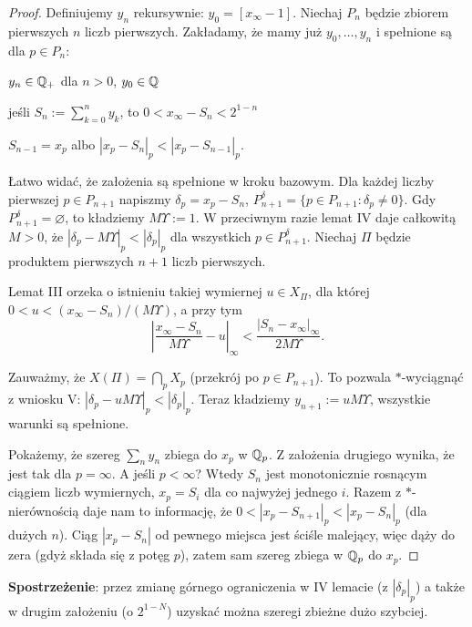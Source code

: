 \begin{proof}
	Definiujemy $y_n$ rekursywnie: $y_0 = [x_\infty -1]$.
	Niechaj $P_n$ będzie zbiorem pierwszych $n$ liczb pierwszych.
	Zakładamy, że mamy już $y_0, \dots, y_n$ i spełnione są dla $p \in P_n$:
	\begin{enumx}
	\item $y_n \in \mathbb Q_+$ dla $n > 0$, $y_0 \in \mathbb Q$
	\item jeśli $S_n := \sum_{k=0}^n y_k$, to $0 < x_\infty - S_n < 2^{1-n}$
	\item $S_{n-1} = x_p$ albo $|x_p - S_n|_p < |x_p - S_{n-1}|_p$.
	\end{enumx}
	
	Łatwo widać, że założenia są spełnione w kroku bazowym.
	Dla każdej liczby pierwszej $p \in P_{n+1}$ napiszmy $\delta_p = x_p - S_n$, $P_{n+1}^\delta = \{p \in P_{n+1}: \delta_p \neq 0\}$.
	Gdy $P^\delta_{n+1} = \varnothing$, to kładziemy $M \Upsilon := 1$.
	W przeciwnym razie lemat IV daje całkowitą $M > 0$, że $|\delta_p - M \Upsilon|_p < |\delta_p|_p$ dla wszystkich $p \in P^\delta_{n+1}$.
	Niechaj $\Pi$ będzie produktem pierwszych $n+1$ liczb pierwszych.
	
	Lemat III orzeka o istnieniu takiej wymiernej $u \in X_\Pi$, dla której $0 < u < (x_\infty - S_n) / (M\Upsilon)$, a przy tym
	\[
		\left|\frac{x_\infty-S_n}{M \Upsilon} - u\right|_\infty < \frac{|S_n - x_\infty|_\infty}{2 M \Upsilon}.
	\]

	Zauważmy, że $X(\Pi) = \bigcap_p X_p$ (przekrój po $p \in P_{n+1}$).
	To pozwala $*$-wyciągnąć z wniosku V: $|\delta_p - u M \Upsilon|_p < |\delta_p|_p$.
	Teraz kładziemy $y_{n+1} := u M \Upsilon$, wszystkie warunki są spełnione.

	Pokażemy, że szereg $\sum_n y_n$ zbiega do $x_p$ w $\mathbb Q_p$.
	Z założenia drugiego wynika, że jest tak dla $p = \infty$.
	A jeśli $p < \infty$?
	Wtedy $S_n$ jest monotonicznie rosnącym ciągiem liczb wymiernych, $x_p = S_i$ dla co najwyżej jednego $i$.
	Razem z $*$-nierównością daje nam to informację, że $0 < |x_p - S_{n+1}|_p < |x_p - S_n|_p$ (dla dużych $n$).
	Ciąg $|x_p - S_n|$ od pewnego miejsca jest ściśle malejący, więc dąży do zera (gdyż składa się z potęg $p$), zatem sam szereg zbiega w $\mathbb Q_p$ do $x_p$.
\end{proof}

\textbf{Spostrzeżenie}: przez zmianę górnego ograniczenia w IV lemacie (z $|\delta_p|_p$) a także w drugim założeniu (o $2^{1-N}$) uzyskać można szeregi zbieżne dużo szybciej.